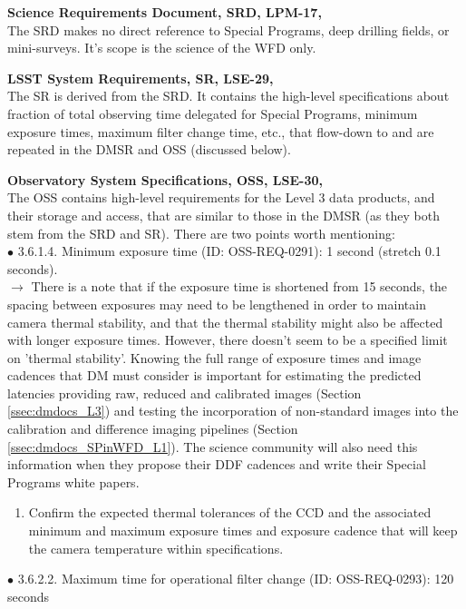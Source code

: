 \documentclass[DM,lsstdraft,toc]{lsstdoc}
\begin{document}
\noindent \textbf{Science Requirements Document, SRD, LPM-17, \cite{LPM-17}}\\
The SRD makes no direct reference to Special Programs, deep drilling fields, or mini-surveys. It's scope is the science of the WFD only.

\noindent \textbf{LSST System Requirements, SR, LSE-29, \cite{LSE-29}}\\
The SR is derived from the SRD. It contains the high-level specifications about fraction of total observing time delegated for Special Programs, minimum exposure times, maximum filter change time, etc., that flow-down to and are repeated in the DMSR and OSS (discussed below).

\noindent \textbf{Observatory System Specifications, OSS, LSE-30, \cite{LSE-30}}\\
The OSS contains high-level requirements for the Level 3 data products, and their storage and access, that are similar to those in the DMSR (as they both stem from the SRD and SR). There are two points worth mentioning: \\
$\bullet$ 3.6.1.4. Minimum exposure time (ID: OSS-REQ-0291): 1 second (stretch 0.1 seconds). \\
$\rightarrow$ There is a note that if the exposure time is shortened from 15 seconds, the spacing between exposures may need to be lengthened in order to maintain camera thermal stability, and that the thermal stability might also be affected with longer exposure times. However, there doesn't seem to be a specified limit on 'thermal stability'. Knowing the full range of exposure times and image cadences that DM must consider is important for estimating the predicted latencies providing raw, reduced and calibrated images (Section \ref{ssec:dmdocs_L3}) and testing the incorporation of non-standard images into the calibration and difference imaging pipelines (Section \ref{ssec:dmdocs_SPinWFD_L1}). The science community will also need this information when they propose their DDF cadences and write their Special Programs white papers.
\begin{enumerate}[resume,topsep=-10pt,label= \textbf{Concern \Roman*.}] \item \label{C5} Confirm the expected thermal tolerances of the CCD and the associated minimum and maximum exposure times and exposure cadence that will keep the camera temperature within specifications. \end{enumerate}
$\bullet$ 3.6.2.2. Maximum time for operational filter change (ID: OSS-REQ-0293): 120 seconds \\
\end{document}
